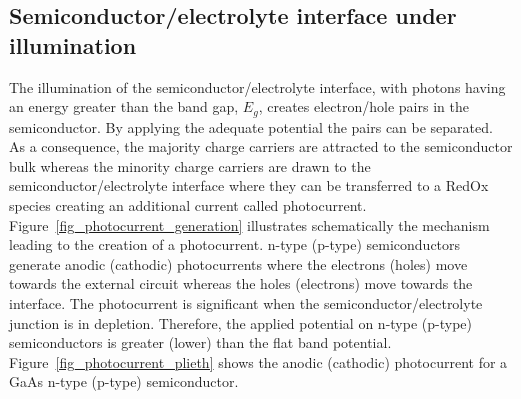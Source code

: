 
\clearpage


\subsection{Semiconductor/electrolyte interface under illumination}
The illumination of the semiconductor/electrolyte interface, 
with photons having an energy greater than the band gap, $E_g$, creates 
electron/hole pairs in the semiconductor. 
By applying the adequate potential the pairs can be separated. 
As a consequence, the majority charge carriers are attracted to the 
semiconductor bulk whereas the minority charge carriers are drawn to the 
semiconductor/electrolyte interface where they can be transferred to a RedOx 
species creating an additional current called photocurrent.  
Figure~\ref{fig_photocurrent_generation} illustrates schematically the 
mechanism leading to the creation of a photocurrent. n-type (p-type) 
semiconductors generate anodic (cathodic) photocurrents where the 
electrons (holes) move towards the external circuit whereas the holes (electrons) 
move towards the interface. 
The photocurrent is significant when the semiconductor/electrolyte junction 
is in depletion. 
Therefore, the applied potential on n-type (p-type) semiconductors is 
greater (lower) than the flat band potential.
Figure~\ref{fig_photocurrent_plieth} shows the anodic (cathodic) photocurrent 
for a GaAs n-type (p-type) semiconductor.



